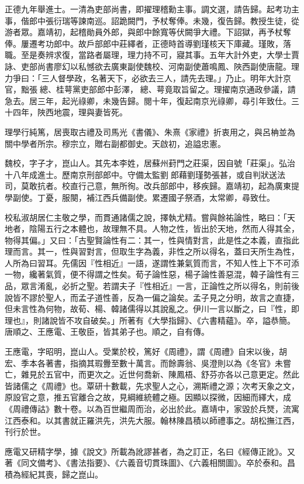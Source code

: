 \begin{pinyinscope}
正德九年舉進士。一清為吏部尚書，即擢理稽勳主事。調文選，請告歸。起考功主事，偕郎中張衍瑞等諫南巡。詔跪闕門，予杖奪俸。未幾，復告歸。教授生徒，從游者眾。嘉靖初，起稽勛員外郎，與郎中餘寬等伏闕爭大禮。下詔獄，再予杖奪俸。屢遷考功郎中。故戶部郎中莊繹者，正德時首導劉瑾核天下庫藏。瑾敗，落職。至是奏辨求復，當路者屬理，理力持不可，寢其事。五年大計外吏，大學士賈詠、吏部尚書廖幻以私憾欲去廣東副使魏校、河南副使蕭鳴鳳、陜西副使唐龍。理力爭曰：「三人督學政，名著天下，必欲去三人，請先去理。」乃止。明年大計京官，黜張總、桂萼黨吏部郎中彭澤，總、萼竟取旨留之。理擢南京通政參議，請急去。居三年，起光祿卿，未幾告歸。閱十年，復起南京光祿卿，尋引年致仕。三十四年，陜西地震，理與妻皆死。

理學行純篤，居喪取古禮及司馬光《書儀》、朱熹《家禮》折衷用之，與呂柟並為關中學者所宗。穆宗立，贈右副都御史。天啟初，追謚忠憲。

魏校，字子才，崑山人。其先本李姓，居蘇州葑門之莊渠，因自號「莊渠」。弘治十八年成進士。歷南京刑部郎中。守備太監劉郎藉劉瑾勢張甚，或自判狀送法司，莫敢抗者。校直行己意，無所徇。改兵部郎中，移疾歸。嘉靖初，起為廣東提學副使。丁憂，服闋，補江西兵備副使。累遷國子祭酒，太常卿，尋致仕。

校私淑胡居仁主敬之學，而貫通諸儒之說，擇執尤精。嘗與餘祐論性，略曰：「天地者，陰陽五行之本體也，故理無不具。人物之性，皆出於天地，然而人得其全，物得其偏。」又曰：「古聖賢論性有二：其一，性與情對言，此是性之本義，直指此理而言。其一，性與習對言，但取生字為義，非性之所以得名，蓋曰天所生為性，人所為曰習耳。先儒因『性相近』一語，遂謂性兼氣質而言，不知人性上下不可添一物，纔著氣質，便不得謂之性矣。荀子論性惡，楊子論性善惡混，韓子論性有三品，眾言淆亂，必折之聖。若謂夫子『性相近』一言，正論性之所以得名，則前後說皆不謬於聖人，而孟子道性善，反為一偏之論矣。孟子見之分明，故言之直捷，但未言性為何物，故荀、楊、韓諸儒得以其說亂之。伊川一言以斷之，曰『性，即理也』，則諸說皆不攻自破矣。」所著有《大學指歸》、《六書精蘊》。卒，謚恭簡。唐順之、王應電、王敬臣，皆其弟子也。順之，自有傳。

王應電，字昭明，崑山人。受業於校，篤好《周禮》，謂《周禮》自宋以後，胡宏、季本各著書，指摘其瑕釁至數十萬言。而餘壽翁、吳澄則以為《冬官》未嘗亡，雜見於五官中，而更次之。近世何喬新、陳鳳梧、舒芬亦各以己意更定。然此皆諸儒之《周禮》也。覃研十數載，先求聖人之心，溯斯禮之源；次考天象之文，原設官之意，推五官離合之故，見綱維統體之極。因顯以探微，因細而繹大，成《周禮傳詁》數十卷。以為百世繼周而治，必出於此。嘉靖中，家毀於兵燹，流寓江西泰和。以其書就正羅洪先，洪先大服。翰林陳昌積以師禮事之。胡松撫江西，刊行於世。

應電又研精字學，據《說文》所載為訛謬甚者，為之訂正，名曰《經傳正訛》。又著《同文備考》、《書法指要》、《六義音切貫珠圖》、《六義相關圖》。卒於泰和。昌積為經紀其喪，歸之崑山。


\end{pinyinscope}
